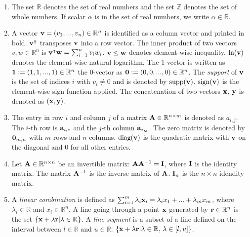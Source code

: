 \begin{enumerate}
    \item The set $\mathbb{R}$ denotes the set of real numbers and the set $\mathbb{Z}$ denotes the set of whole numbers. If scalar $\alpha$ is in the set of real numbers, we write $\alpha \in \mathbb R$.  %
    
    \item A vector $\bold{v} = (v_1, ..., v_n) \in \mathbb{R}^n$ is identified as a column vector and printed in bold. $\bold v^\intercal$ transposes $\bold v$ into a row vector. The inner product of two vectors $v, w \in \mathbb{R}^n$ is $\bold v^\intercal \bold w = \sum_{i=1}^n v_i w_i$. $\bold v \leq \bold w$ denotes element-wise inequality. $\ln (\bold v)$ denotes the element-wise natural logarithm. 
    The 1-vector is written as $\bold 1 := (1, 1, ..., 1) \in \mathbb{R}^n$ the 0-vector as $\bold 0 := (0, 0, ..., 0) \in \mathbb{R}^n$. The \textit{support} of $\bold{v}$ is the set of indices $i$ with $v_i \neq 0$ and is denoted by $\text{supp}(\bold v)$. $\text{sign}(\bold v)$ is the element-wise sign function applied.
    The concatenation of two vectors $\bold x$, $\bold y$ is denoted as $(\bold x, \bold y)$.

    \item The entry in row $i$ and column $j$ of a matrix $ \bold A \in \mathbb{R}^{n \times m}$ is denoted as $a_{i,j}$. The $i$-th row is $\bold a_{i,*}$ and the $j$-th column $\bold a_{*,j}$.  The zero matrix is denoted by $\bold 0_{m,n}$ with $m$ rows and $n$ columns. $\text{diag}(\bold v)$ is the quadratic matrix with $\bold v$ on the diagonal and 0 for all other entries.
    
    \item Let $\bold A \in \mathbb{R}^{n \times n}$ be an invertible matrix: $ \bold A \bold A^{-1} = \bold I$, where $\bold I$ is the identity matrix. The matrix $ \bold A^{-1}$ is the inverse matrix of $ \bold A$. %
    $\bold I_n$ is the $n \times n$ idendity matrix.

    \item A \textit{linear combination} is defined as $\sum_{i=1}^{m} \lambda_i \bold x_i = 
    \lambda_i x_1 + ... + \lambda_m x_m$, where $\lambda_i \in \mathbb{R}$ and $x_i \in \mathbb{R}^n$.
    A line going through a point $\bold x$ generated by $\bold r \in \mathbb{R}^n$ is the set $\{\bold x + \lambda \bold r | \lambda \in \mathbb{R}\}$. A \textit{line segment} is a subset of a line defined on the interval between $l \in \mathbb{R}$ and $u \in \mathbb{R}$: $\{\bold x + \lambda \bold r | \lambda \in \mathbb{R}, \, \lambda \in [l, u ]\}$.


\end{enumerate}
